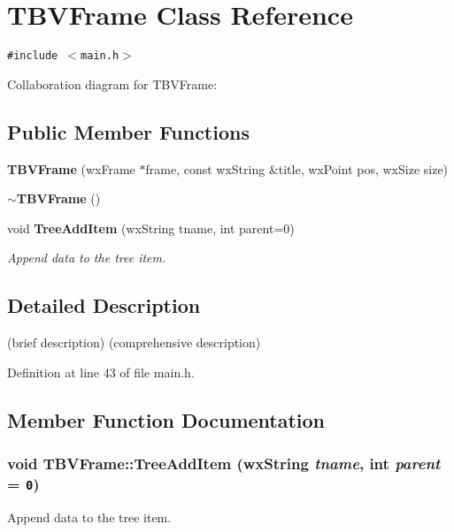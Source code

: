 \section{TBVFrame Class Reference}
\label{class_t_b_v_frame}
{\tt \#include $<$main.h$>$}

Collaboration diagram for TBVFrame:\subsection*{Public Member Functions}
\begin{CompactItemize}
\item 
{\bf TBVFrame} (wx\-Frame $\ast$frame, const wx\-String \&title, wx\-Point pos, wx\-Size size)\label{class_t_b_v_frame_aa1d418070a0187e1e77a346b3e68722}

\item 
{\bf $\sim$TBVFrame} ()\label{class_t_b_v_frame_729c2bc9310ec2954ec388663bd43241}

\item 
void {\bf Tree\-Add\-Item} (wx\-String tname, int parent=0)
\begin{CompactList}\small\item\em Append data to the tree item. \item\end{CompactList}\end{CompactItemize}


\subsection{Detailed Description}
(brief description)  (comprehensive description) 



Definition at line 43 of file main.h.

\subsection{Member Function Documentation}
\subsubsection{\setlength{\rightskip}{0pt plus 5cm}void TBVFrame::Tree\-Add\-Item (wx\-String {\em tname}, int {\em parent} = {\tt 0})}\label{class_t_b_v_frame_5b35fee9a0c0f4d9c5eb5bc71bf4730c}


Append data to the tree item. 

